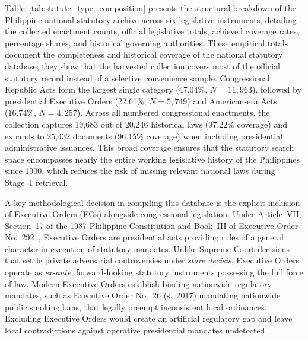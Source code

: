         Table~\ref{tab:statute_type_composition} presents the structural breakdown of the Philippine national statutory archive across six legislative instruments, detailing the collected enactment counts, official legislative totals, achieved coverage rates, percentage shares, and historical governing authorities. These empirical totals document the completeness and historical coverage of the national statutory database; they show that the harvested collection covers most of the official statutory record instead of a selective convenience sample. Congressional Republic Acts form the largest single category (47.04\%, $N=11,963$), followed by presidential Executive Orders (22.61\%, $N=5,749$) and American-era Acts (16.74\%, $N=4,257$). Across all numbered congressional enactments, the collection captures 19,683 out of 20,246 historical laws (97.22\% coverage) and expands to 25,432 documents (96.15\% coverage) when including presidential administrative issuances. This broad coverage ensures that the statutory search space encompasses nearly the entire working legislative history of the Philippines since 1900, which reduces the risk of missing relevant national laws during Stage~1 retrieval.

        A key methodological decision in compiling this database is the explicit inclusion of Executive Orders (EOs) alongside congressional legislation. Under Article~VII, Section~17 of the 1987 Philippine Constitution and Book~III of Executive Order No.~292~\cite{philgov1987eo292}, Executive Orders are presidential acts providing rules of a general character in execution of statutory mandates. Unlike Supreme Court decisions that settle private adversarial controversies under \textit{stare decisis}, Executive Orders operate as \textit{ex-ante}, forward-looking statutory instruments possessing the full force of law. Modern Executive Orders establish binding nationwide regulatory mandates, such as Executive Order No.~26 (s.~2017) mandating nationwide public smoking bans, that legally preempt inconsistent local ordinances. Excluding Executive Orders would create an artificial regulatory gap and leave local contradictions against operative presidential mandates undetected.

